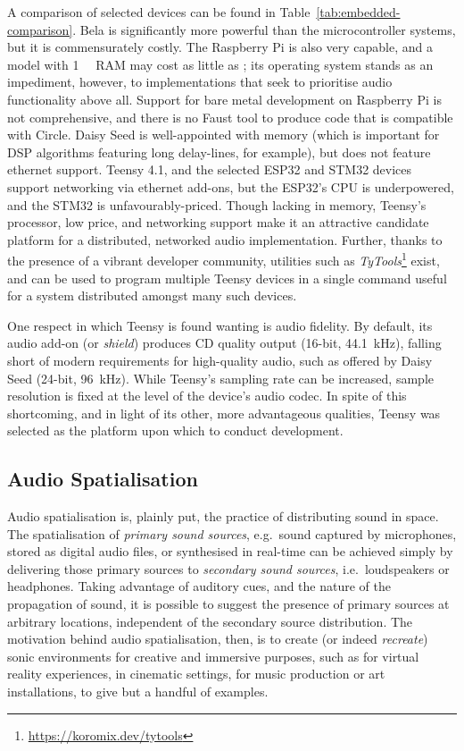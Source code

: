 \documentclass[utf8]{FrontiersinHarvard}
\newcommand{\tabref}[1]{Table~\ref{#1}}
\begin{document}
    A comparison of selected devices can be found in
    \tabref{tab:embedded-comparison}.
    Bela is significantly more powerful than the microcontroller systems, but it is
    commensurately costly.
    The Raspberry Pi is also very capable, and a model with \qty{1}{\giga\byte} RAM
    may cost as little as ;
    its operating system stands as an impediment, however, to implementations that
    seek to prioritise audio functionality above all.
    Support for bare metal development on Raspberry Pi is not comprehensive, and
    there is no Faust tool to produce code that is compatible with Circle.
    Daisy Seed is well-appointed with memory (which is important for DSP algorithms
    featuring long delay-lines, for example), but does not feature ethernet support.
    Teensy 4.1, and the selected ESP32 and STM32 devices support networking via
    ethernet add-ons, but the ESP32's CPU is underpowered, and the STM32 is
    unfavourably-priced.
    Though lacking in memory, Teensy's processor, low price, and networking support
    make it an attractive candidate platform for a distributed, networked audio
    implementation.
    Further, thanks to the presence of a vibrant developer community, utilities such
    as \textit{TyTools}\footnote{\url{https://koromix.dev/tytools}} exist, and can
    be used to program multiple Teensy devices in a single command \textemdash{}
    useful for a system distributed amongst many such devices.

    One respect in which Teensy is found wanting is audio fidelity.
    By default, its audio add-on (or \textit{shield}) produces CD quality output
    (16-bit, \qty{44.1}{\kHz}), falling short of modern requirements for
    high-quality audio, such as offered by Daisy Seed (24-bit, \qty{96}{\kHz}).
    While Teensy's sampling rate can be increased, sample resolution is fixed at
    the level of the device's audio codec.
    In spite of this shortcoming, and in light of its other, more advantageous
    qualities, Teensy was selected as the platform upon which to conduct
    development.

    \subsection{Audio Spatialisation}\label{subsec:audio-spatialisation}

    Audio spatialisation is, plainly put, the practice of distributing sound in
    space.
    The spatialisation of \textit{primary sound sources}, e.g.\ sound
    captured by microphones, stored as digital audio files, or synthesised in
    real-time can be achieved simply by delivering those primary sources to
    \textit{secondary sound sources}, i.e.\ loudspeakers or headphones.
    Taking advantage of auditory cues, and the nature of the propagation of sound,
    it is possible to suggest the presence of primary sources at arbitrary
    locations, independent of the secondary source distribution.
    The motivation behind audio spatialisation, then, is to create (or indeed
    \textit{recreate}) sonic environments for creative and immersive purposes, such
    as for virtual reality experiences, in cinematic settings, for music production
    or art installations, to give but a handful of examples.
\end{document}

